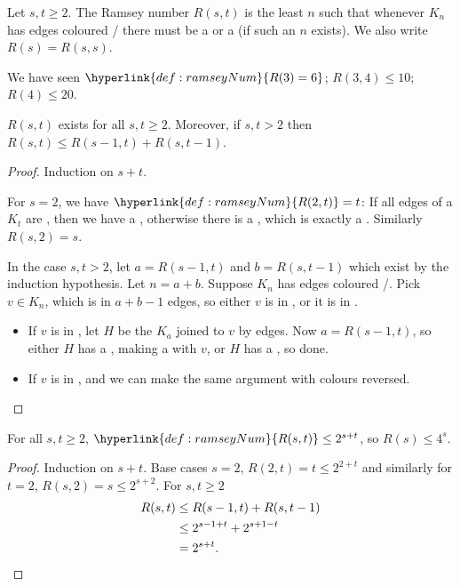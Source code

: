 \documentclass{article}
\begin{document}
\begin{defi}
    Let $s, t \geq 2$. The Ramsey number $R(s, t)$ is the least $n$ such that whenever \hyperlink{def:Kn}{$K_n$} has edges coloured / there must be a  or a  (if such an $n$ exists).
    We also write $R(s) = R(s, s)$.
\end{defi}

We have seen $\hyperlink{def:ramseyNum}{R(3) = 6}$; $R(3, 4) \leq 10$; $R(4) \leq 20$.

\begin{nthm}\label{thm:ramsey}
    \hyperlink{def:ramseyNum}{$R(s, t)$} exists for all $s, t \geq 2$.
    Moreover, if $s, t > 2$ then $R(s, t) \leq R(s-1, t) + R(s, t-1)$.
\end{nthm}

\begin{proof}
    Induction on $s+t$.

    For $s=2$, we have $\hyperlink{def:ramseyNum}{R(2, t)} = t$: If all edges of a $K_t$ are , then we have a , otherwise there is a , which is exactly a .  Similarly $R(s, 2) = s$.

    In the case $s, t > 2$, let $a = R(s-1, t)$ and $b = R(s, t-1)$ which exist by the induction hypothesis.  Let $n = a+b$. Suppose $K_n$ has edges coloured /.
    Pick $v \in K_n$, which is in $a+b-1$ edges, so either $v$ is in , or it is in .
    \begin{itemize}
        \item If $v$ is in , let $H$ be the $K_a$ joined to $v$ by  edges.  Now $a = R(s-1, t)$, so either $H$ has a , making a  with $v$, or $H$ has a , so done.
        \item If $v$ is in , and we can make the same argument with colours reversed. \qedhere
    \end{itemize}
\end{proof}

\begin{ncor}\label{cor:3}
    For all $s, t \geq 2$, $\hyperlink{def:ramseyNum}{R(s, t)} \leq 2^{s+t}$, so $R(s) \leq 4^s$.
\end{ncor}

\begin{proof}
    Induction on $s + t$.  Base cases $s=2$, $R(2, t) = t \leq 2^{2+t}$ and similarly for $t=2$, $R(s, 2) = s \leq 2^{s+2}$.
    For $s, t \geq 2$
    \begin{align*}
        R(s, t) &\leq R(s-1, t) + R(s, t-1) \\
                &\leq 2^{s-1+t} + 2^{s+1-t} \\
                &= 2^{s+t}. \qedhere
    \end{align*}
\end{proof}
\end{document}
